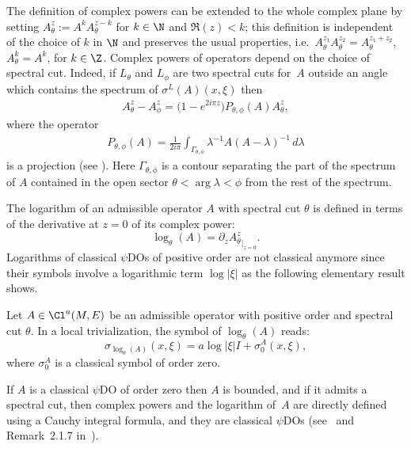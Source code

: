 The def\/inition of complex powers can be extended to the whole complex plane by setting $A_{\theta}^z:=A^kA_{\theta}^{z-k}$ for $k\in \N$ and $\Re(z)<k$; this def\/inition is independent of the choice of $k$ in $\N$ and preserves the usual properties, i.e.\ $A_{\theta}^{z_1}A_{\theta}^{z_2}=A_{\theta}^{z_1+z_2}$, $A_{\theta}^k=A^k$, for $k\in\Z$.
Complex powers of operators depend on the choice of spectral cut. Indeed, if $L_{\theta}$ and $L_{\phi}$ are two spectral cuts for~$A$ outside an angle which contains the spectrum of $\sigma^L(A)(x,\xi)$ then
\begin{gather}
A_\theta^z-A_\phi^z=\big(1-e^{2i\pi z} \big)  P_{\theta, \phi} (A) A_\theta^z, \label{eq:DifferenceComplexPowers}
\end{gather}
where the operator
\begin{gather}
 P_{\theta, \phi} (A)=\frac{1}{2i\pi} \int_{\Gamma_{\theta,\phi}}\lambda^{-1}A(A-\lambda)^{-1}\,d\lambda \label{projection}
\end{gather}
is a projection (see \cite{PongeAsymmetry, WodzickiThesis}). Here $\Gamma_{\theta,\phi}$ is a contour separating the part of the spectrum of $A$ contained in the open sector $\theta<\arg\lambda<\phi$ from the rest of the spectrum.

The logarithm  of an admissible operator $A$ with spectral cut $\theta$  is def\/ined in terms of the derivative at $z=0$ of its complex power:
\[
\log_\theta(A)= \partial_z {A_\theta^{z}} _{\vert_{z=0}}.
\]
Logarithms of classical $\psi$DOs of positive order are not classical anymore since their symbols involve a logarithmic term $\log\vert \xi\vert$ as the following elementary result shows.

\begin{proposition}\label{prop:leadsymbolsigmathetaA}
Let $A\in \Cl^{a}(M, E)$ be an admissible operator with positive order and spectral cut $\theta$. In a local trivialization, the symbol of $\log_\theta(A)$ reads:
\[
\sigma_{\log_\theta(A)}(x, \xi)=a  \log \vert \xi\vert  I +\sigma_0^A(x,\xi),
\]
where $\sigma_0^A$ is a classical symbol of order zero.
\end{proposition}

\begin{remark}
If $A$ is a classical $\psi$DO of order zero then $A$ is bounded, and if it admits a spectral cut, then complex powers and the logarithm of~$A$ are directly def\/ined using a Cauchy integral formula, and they are classical $\psi$DOs (see~\cite{okikiolu} and Remark~2.1.7 in~\cite{ouedraogothese}).
\end{remark}

